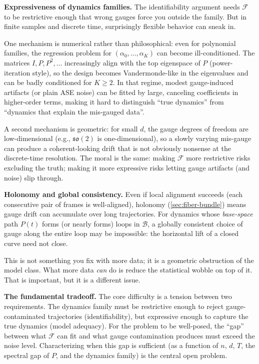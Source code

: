 \documentclass{article}
\newcommand{\so}{\mathfrak{so}}
\theoremstyle{plain}
\theoremstyle{definition}
\theoremstyle{remark}
\begin{document}
\textbf{Expressiveness of dynamics families.}
The identifiability argument needs $\mathcal{F}$ to be restrictive enough that wrong gauges force you outside the family.
But in finite samples and discrete time, surprisingly flexible behavior can sneak in.

One mechanism is numerical rather than philosophical: even for polynomial families, the regression problem for $(\alpha_0, \ldots, \alpha_K)$ can become ill-conditioned.
The matrices $I, P, P^2, \ldots$ increasingly align with the top eigenspace of $P$ (power-iteration style), so the design becomes Vandermonde-like in the eigenvalues and can be badly conditioned for $K \ge 2$.
In that regime, modest gauge-induced artifacts (or plain ASE noise) can be fitted by large, canceling coefficients in higher-order terms, making it hard to distinguish ``true dynamics'' from ``dynamics that explain the mis-gauged data''.

A second mechanism is geometric: for small $d$, the gauge degrees of freedom are low-dimensional (e.g., $\so(2)$ is one-dimensional), so a slowly varying mis-gauge can produce a coherent-looking drift that is not obviously nonsense at the discrete-time resolution.
The moral is the same: making $\mathcal{F}$ more restrictive risks excluding the truth; making it more expressive risks letting gauge artifacts (and noise) slip through.

\textbf{Holonomy and global consistency.}
Even if local alignment succeeds (each consecutive pair of frames is well-aligned), holonomy (\cref{sec:fiber-bundle}) means gauge drift can accumulate over long trajectories.
For dynamics whose \emph{base-space} path $P(t)$ forms (or nearly forms) loops in $\mathcal{B}$, a globally consistent choice of gauge along the entire loop may be impossible: the horizontal lift of a closed curve need not close.

This is not something you fix with more data; it is a geometric obstruction of the model class.
What more data \emph{can} do is reduce the statistical wobble on top of it. That is important, but it is a different issue.

\textbf{The fundamental tradeoff.}
The core difficulty is a tension between two requirements.
The dynamics family must be restrictive enough to reject gauge-contaminated trajectories (identifiability), but expressive enough to capture the true dynamics (model adequacy).
For the problem to be well-posed, the ``gap'' between what $\mathcal{F}$ can fit and what gauge contamination produces must exceed the noise level.
Characterizing when this gap is sufficient (as a function of $n$, $d$, $T$, the spectral gap of $P$, and the dynamics family) is the central open problem.
\end{document}
